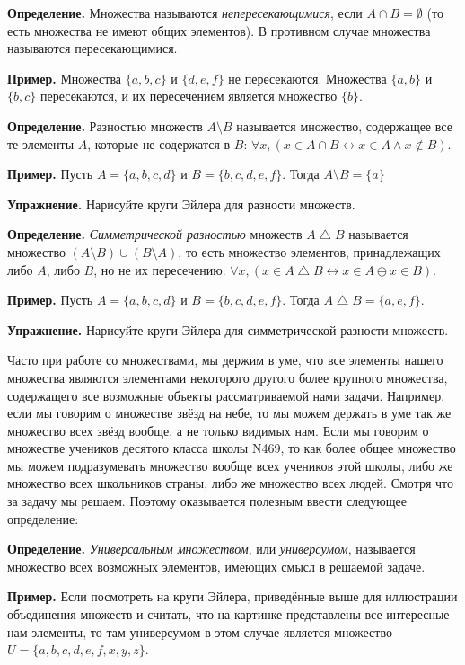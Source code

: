 {\bfseries Определение.} Множества называются {\slshape непересекающимися}, если $A\cap B = \emptyset$ (то есть множества не имеют общих элементов). В противном случае множества называются пересекающимися.

{\bfseries Пример.} Множества $\{a, b, c\}$ и $\{d, e, f\}$ не пересекаются. Множества $\{a, b\}$ и $\{b, c\}$ пересекаются, и их пересечением является множество $\{b\}$.

{\bfseries Определение.} Разностью множеств $A\setminus B$ называется множество, содержащее все те элементы $A$, которые не содержатся в $B$: $\forall x, (x \in A\cap B \leftrightarrow x\in A \wedge x \not \in B)$.

{\bfseries Пример.} Пусть $A = \{a, b, c, d\}$ и $B = \{b, c, d, e, f\}$. Тогда $A\setminus B = \{a\}$

{\bfseries Упражнение.} Нарисуйте круги Эйлера для разности множеств.

{\bfseries Определение.} {\slshape Симметрической разностью} множеств $A\bigtriangleup B$ называется множество $(A\setminus B)\cup (B\setminus A)$, то есть множество элементов, принадлежащих либо $A$, либо $B$, но не их пересечению: $\forall x,(x\in A\bigtriangleup B \leftrightarrow x\in A \oplus x\in B)$.

{\bfseries Пример.} Пусть $A = \{a, b, c, d\}$ и $B = \{b, c, d, e, f\}$. Тогда $A\bigtriangleup B = \{a, e, f\}$.

{\bfseries Упражнение.} Нарисуйте круги Эйлера для симметрической разности множеств.

Часто при работе со множествами, мы держим в уме, что все элементы нашего множества являются элементами некоторого другого более крупного множества, содержащего все возможные объекты рассматриваемой нами задачи. Например, если мы говорим о множестве звёзд на небе, то мы можем держать в уме так же множество всех звёзд вообще, а не только видимых нам. Если мы говорим о множестве учеников десятого класса школы N469, то как более общее множество мы можем подразумевать множество вообще всех учеников этой школы, либо же множество всех школьников страны, либо же множество всех людей. Смотря что за задачу мы решаем. Поэтому оказывается полезным ввести следующее определение:

{\bfseries Определение.} {\slshape Универсальным множеством}, или {\slshape универсумом}, называется множество всех возможных элементов, имеющих смысл в решаемой задаче.

{\bfseries Пример.} Если посмотреть на круги Эйлера, приведённые выше для иллюстрации объединения множеств и считать, что на картинке представлены все интересные нам элементы, то там универсумом в этом случае является множество $U = \{a, b, c, d, e, f, x, y, z\}$.

